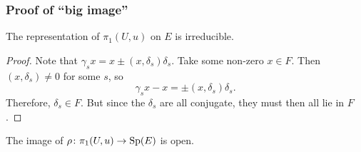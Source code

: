 \subsubsection{Proof of ``big image''}
\begin{cor}
The representation of $\pi_1(U,u)$ on $E$ is irreducible.
\end{cor}

\begin{proof}
Note that $\gamma_s x  = x \pm (x, \delta_s) \delta_s$. Take some non-zero $x \in F$. Then $(x, \delta_s) \neq 0$ for some $s$, so 
\[
\gamma_s x - x = \pm (x, \delta_s) \delta_s.
\]
Therefore, $\delta_s \in F$. But since the $\delta_s$ are all conjugate, they must then all lie in $F$. 
\end{proof}

\begin{thm}\label{big_image}
The image of $\rho \colon \pi_1(U,u) \rightarrow \operatorname{Sp}(E)$ is open.
\end{thm}

